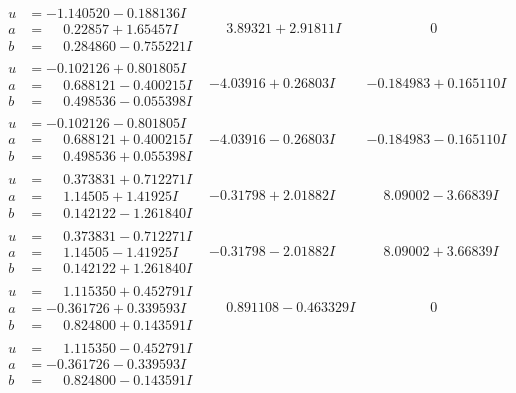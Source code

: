 \documentclass[1p]{elsarticle_modified}
\theoremstyle{definition}
\begin{document}
$$\begin{array}{c|c|c}
\begin{aligned}
u &= -1.140520 - 0.188136 I \\
a &= \phantom{-}0.22857 + 1.65457 I \\
b &= \phantom{-}0.284860 - 0.755221 I\end{aligned}
 & \phantom{-}3.89321 + 2.91811 I & \phantom{-0.000000 } 0 \\ \hline\begin{aligned}
u &= -0.102126 + 0.801805 I \\
a &= \phantom{-}0.688121 - 0.400215 I \\
b &= \phantom{-}0.498536 - 0.055398 I\end{aligned}
 & -4.03916 + 0.26803 I & -0.184983 + 0.165110 I \\ \hline\begin{aligned}
u &= -0.102126 - 0.801805 I \\
a &= \phantom{-}0.688121 + 0.400215 I \\
b &= \phantom{-}0.498536 + 0.055398 I\end{aligned}
 & -4.03916 - 0.26803 I & -0.184983 - 0.165110 I \\ \hline\begin{aligned}
u &= \phantom{-}0.373831 + 0.712271 I \\
a &= \phantom{-}1.14505 + 1.41925 I \\
b &= \phantom{-}0.142122 - 1.261840 I\end{aligned}
 & -0.31798 + 2.01882 I & \phantom{-}8.09002 - 3.66839 I \\ \hline\begin{aligned}
u &= \phantom{-}0.373831 - 0.712271 I \\
a &= \phantom{-}1.14505 - 1.41925 I \\
b &= \phantom{-}0.142122 + 1.261840 I\end{aligned}
 & -0.31798 - 2.01882 I & \phantom{-}8.09002 + 3.66839 I \\ \hline\begin{aligned}
u &= \phantom{-}1.115350 + 0.452791 I \\
a &= -0.361726 + 0.339593 I \\
b &= \phantom{-}0.824800 + 0.143591 I\end{aligned}
 & \phantom{-}0.891108 - 0.463329 I & \phantom{-0.000000 } 0 \\ \hline\begin{aligned}
u &= \phantom{-}1.115350 - 0.452791 I \\
a &= -0.361726 - 0.339593 I \\
b &= \phantom{-}0.824800 - 0.143591 I\end{aligned}

\end{array}$$
\end{document}
